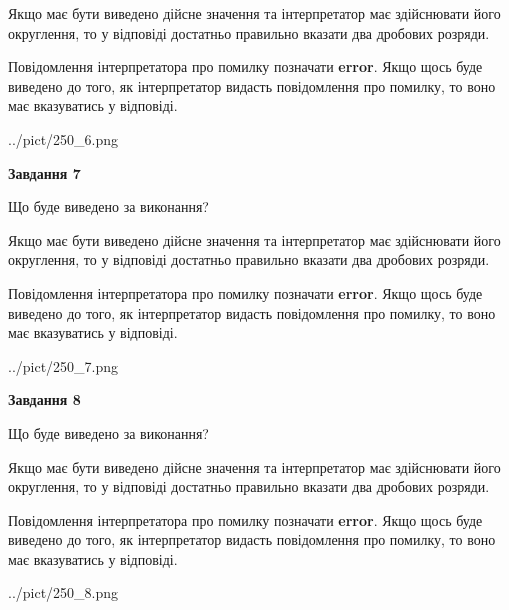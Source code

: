 \documentclass[12pt, ukrainian]{article}
\begin{document}
{\begin {Large}
Якщо має бути виведено дійсне значення та інтерпретатор має здійснювати його округлення, 
то у відповіді достатньо правильно вказати два дробових розряди.

Повідомлення інтерпретатора про помилку позначати \textbf{error}.
Якщо щось буде виведено до того, як інтерпретатор видасть повідомлення про помилку, 
то воно має вказуватись у відповіді. \par

\begin{center}
	{../pict/250_6.png}
\end{center}
\newpage

{\begin {center}\textbf{Завдання 7}\end {center}}\par
Що буде виведено за виконання? \par

Якщо має бути виведено дійсне значення та інтерпретатор має здійснювати його округлення, 
то у відповіді достатньо правильно вказати два дробових розряди.

Повідомлення інтерпретатора про помилку позначати \textbf{error}.
Якщо щось буде виведено до того, як інтерпретатор видасть повідомлення про помилку, 
то воно має вказуватись у відповіді. \par

\begin{center}
	{../pict/250_7.png}
\end{center}
\newpage

{\begin {center}\textbf{Завдання 8}\end {center}}\par
Що буде виведено за виконання? \par

Якщо має бути виведено дійсне значення та інтерпретатор має здійснювати його округлення, 
то у відповіді достатньо правильно вказати два дробових розряди.

Повідомлення інтерпретатора про помилку позначати \textbf{error}.
Якщо щось буде виведено до того, як інтерпретатор видасть повідомлення про помилку, 
то воно має вказуватись у відповіді. \par

\begin{center}
	{../pict/250_8.png}
\end{center}
\newpage


\end{Large}}
\end{document}
